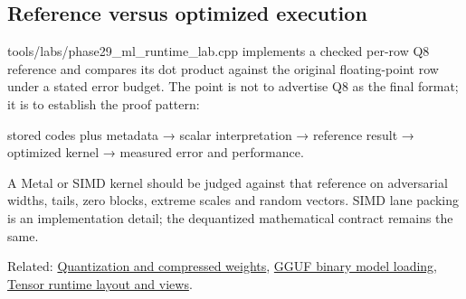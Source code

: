 \subsection{Reference versus optimized execution}\label{appendix-241c0e42ac2d-reference-versus-optimized-execution}

tools/labs/phase29\_ml\_runtime\_lab.cpp implements a checked per-row Q8 reference and compares its dot product against the original floating-point row under a stated error budget. The point is not to advertise Q8 as the final format; it is to establish the proof pattern:

stored codes plus metadata → scalar interpretation → reference result → optimized kernel → measured error and performance.

A Metal or SIMD kernel should be judged against that reference on adversarial widths, tails, zero blocks, extreme scales and random vectors. SIMD lane packing is an implementation detail; the dequantized mathematical contract remains the same.

Related: \hyperref[appendix-fdc7879e8bf2]{Quantization and compressed weights}, \hyperref[appendix-fef72dd246f2]{GGUF binary model loading}, \hyperref[appendix-cebadf3106d1]{Tensor runtime layout and views}.
